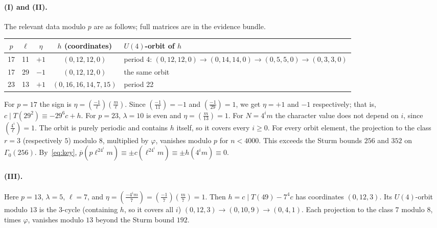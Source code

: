 \documentclass[11pt]{article}
\theoremstyle{remark}\newtheorem{remark}[theorem]{Remark}
\newcommand{\pb}{\overline{p}}
\newcommand{\leg}[2]{\left(\frac{#1}{#2}\right)}
\begin{document}
\paragraph{(I) and (II).} The relevant data modulo $p$ are as follows; full matrices are in the evidence bundle.
\begin{center}\small
\begin{tabular}{@{}ccccl@{}}\toprule
$p$ & $\ell$ & $\eta$ & $h$ (coordinates) & $U(4)$-orbit of $h$\\\midrule
17 & 11 & $+1$ & $(0,12,12,0)$ & period 4: $(0,12,12,0)\to(0,14,14,0)\to(0,5,5,0)\to(0,3,3,0)$\\
17 & 29 & $-1$ & $(0,12,12,0)$ & the same orbit\\
23 & 13 & $+1$ & $(0,16,16,14,7,15)$ & period 22\\\bottomrule
\end{tabular}
\end{center}
For $p=17$ the sign is $\eta=\leg{-1}{\ell}\leg m\ell$. Since $\leg{-1}{11}=-1$ and $\leg{-1}{29}=1$, we get $\eta=+1$ and $-1$ respectively; that is, $c\mid T(29^2)\equiv-29^6c+h$. For $p=23$, $\lambda=10$ is even and $\eta=\leg m{13}=1$. For $N=4^im$ the character value does not depend on $i$, since $\leg{4^i}\ell=1$. The orbit is purely periodic and contains $h$ itself, so it covers every $i\ge0$. For every orbit element, the projection to the class $r=3$ (respectively $5$) modulo $8$, multiplied by $\varphi$, vanishes modulo $p$ for $n<4000$. This exceeds the Sturm bounds $256$ and $352$ on $\Gamma_0(256)$. By~\eqref{eq:key}, $\pb(p\ell^24^im)\equiv\pm c(\ell^24^im)\equiv\pm h(4^im)\equiv0$.

\paragraph{(III).} Here $p=13$, $\lambda=5$, $\ell=7$, and $\eta=\leg{-4^im}{7}=\leg{-1}7\leg m7=1$. Then $h=c\mid T(49)-7^4c$ has coordinates $(0,12,3)$. Its $U(4)$-orbit modulo $13$ is the $3$-cycle (containing $h$, so it covers all $i$) $(0,12,3)\to(0,10,9)\to(0,4,1)$. Each projection to the class $7$ modulo $8$, times $\varphi$, vanishes modulo $13$ beyond the Sturm bound $192$.
\end{document}
